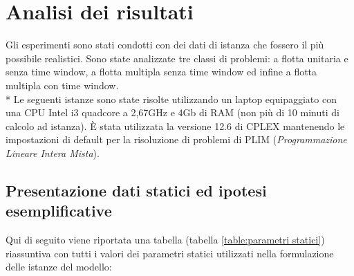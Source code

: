 \chapter{Analisi dei risultati}\label{ch:cap_5}
	Gli esperimenti sono stati condotti con dei dati di istanza che fossero il più possibile realistici. Sono state analizzate tre classi di problemi: a flotta unitaria e senza time window, a flotta multipla senza time window ed infine a flotta multipla con time window. \\*
	Le seguenti istanze sono state risolte utilizzando un laptop equipaggiato con una CPU Intel i3 quadcore a 2,67GHz e 4Gb di RAM (non più di 10 minuti di calcolo ad istanza). È stata utilizzata la versione 12.6 di CPLEX mantenendo le impostazioni di default per la risoluzione di problemi di PLIM (\emph{Programmazione Lineare Intera Mista}).

	\section{Presentazione dati statici ed ipotesi esemplificative}
	\label{sec:il_linguaggio_di_modellazione_ampl}
		Qui di seguito viene riportata una tabella (tabella \ref{table:parametri statici}) riassuntiva con tutti i valori dei parametri statici utilizzati nella formulazione delle istanze del modello:

